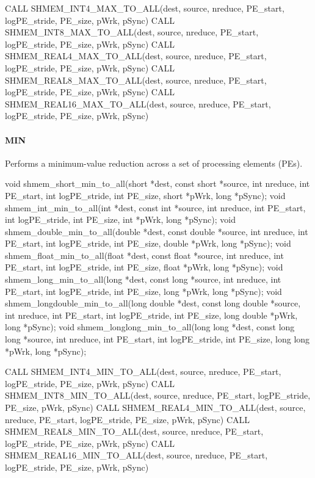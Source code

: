 \begin{apidefinition}
\begin{Fsynopsis}
CALL SHMEM_INT4_MAX_TO_ALL(dest, source, nreduce, PE_start, logPE_stride, PE_size, pWrk, pSync)
CALL SHMEM_INT8_MAX_TO_ALL(dest, source, nreduce, PE_start, logPE_stride, PE_size, pWrk, pSync)
CALL SHMEM_REAL4_MAX_TO_ALL(dest, source, nreduce, PE_start, logPE_stride, PE_size, pWrk, pSync)
CALL SHMEM_REAL8_MAX_TO_ALL(dest, source, nreduce, PE_start, logPE_stride, PE_size, pWrk, pSync)
CALL SHMEM_REAL16_MAX_TO_ALL(dest, source, nreduce, PE_start, logPE_stride, PE_size, pWrk, pSync)
\end{Fsynopsis}

\paragraph{MIN}
Performs a minimum-value reduction across a set of processing elements (\acp{PE}).\newline
\begin{Csynopsis}
void shmem_short_min_to_all(short *dest, const short *source, int nreduce, int PE_start, int logPE_stride, int PE_size, short *pWrk, long *pSync);
void shmem_int_min_to_all(int *dest, const int *source, int nreduce, int PE_start, int logPE_stride, int PE_size, int *pWrk, long *pSync);
void shmem_double_min_to_all(double *dest, const double *source, int nreduce, int PE_start, int logPE_stride, int PE_size, double *pWrk, long *pSync);
void shmem_float_min_to_all(float *dest, const float *source, int nreduce, int PE_start, int logPE_stride, int PE_size, float *pWrk, long *pSync);
void shmem_long_min_to_all(long *dest, const long *source, int nreduce, int PE_start, int logPE_stride, int PE_size, long *pWrk, long *pSync);
void shmem_longdouble_min_to_all(long double *dest, const long double *source, int nreduce, int PE_start, int logPE_stride, int PE_size, long double *pWrk, long *pSync);
void shmem_longlong_min_to_all(long long *dest, const long long *source, int nreduce, int PE_start, int logPE_stride, int PE_size, long long *pWrk, long *pSync);
\end{Csynopsis}

\begin{Fsynopsis}
CALL SHMEM_INT4_MIN_TO_ALL(dest, source, nreduce, PE_start, logPE_stride, PE_size, pWrk, pSync)
CALL SHMEM_INT8_MIN_TO_ALL(dest, source, nreduce, PE_start, logPE_stride, PE_size, pWrk, pSync)
CALL SHMEM_REAL4_MIN_TO_ALL(dest, source, nreduce, PE_start, logPE_stride, PE_size, pWrk, pSync)
CALL SHMEM_REAL8_MIN_TO_ALL(dest, source, nreduce, PE_start, logPE_stride, PE_size, pWrk, pSync)
CALL SHMEM_REAL16_MIN_TO_ALL(dest, source, nreduce, PE_start, logPE_stride, PE_size, pWrk, pSync)
\end{Fsynopsis}


\end{apidefinition}

